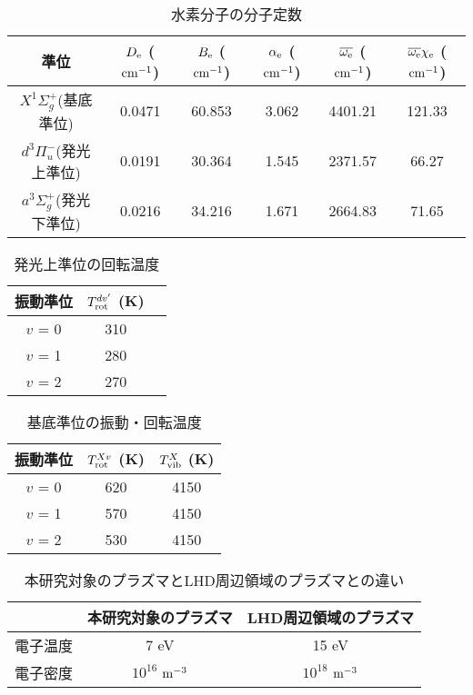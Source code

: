 \listoftables
{}

\begin{table}
    \caption{水素分子の分子定数\cite{nist}}
    \label{table:molecular-constants}
    \centering
    \begin{tabular}{cccccc}
        \hline
        準位 & $D_{\rm e}$ ($\rm cm^{-1}$)& $B_{\rm e}$ ($\rm cm^{-1}$)& $\alpha_{\rm e}$ ($\rm cm^{-1}$)& $\overline{\omega_{\rm e}}$ ($\rm cm^{-1}$)& $\overline{\omega_{\rm e}} \chi_{\rm e}$ ($\rm cm^{-1}$)\\
        \hline
        $X^1 \Sigma^+_g$(基底準位) & 0.0471 & 60.853 & 3.062 & 4401.21 & 121.33\\
        $d^3 \Pi^-_u$(発光上準位) & 0.0191 & 30.364 & 1.545 & 2371.57 & 66.27\\
        $a^3 \Sigma^+_g$(発光下準位) & 0.0216 & 34.216 & 1.671 & 2664.83 & 71.65\\
        \hline
    \end{tabular}
\end{table}

\begin{table}
    \caption{発光上準位の回転温度}
    \label{table:upper-temperatures}
    \centering
    \begin{tabular}{ccc}
        \hline
        振動準位 & $T^{dv'}_{\rm rot}$ (K)\\
        \hline
        $v$ = 0 & 310\\
        $v$ = 1 & 280\\
        $v$ = 2 & 270\\
        \hline
    \end{tabular}
\end{table}

\begin{table}
    \caption{基底準位の振動・回転温度}
    \label{table:fitting-result}
    \centering
    \begin{tabular}{ccc}
        \hline
        振動準位 & $T^{Xv}_{\rm rot}$ (K) & $T^{X}_{\rm vib}$ (K)\\
        \hline
        $v$ = 0 & 620 & 4150\\
        $v$ = 1 & 570 & 4150\\
        $v$ = 2 & 530 & 4150\\
        \hline
    \end{tabular}
\end{table}

\begin{table}
    \caption{本研究対象のプラズマとLHD周辺領域のプラズマとの違い}
    \label{table:LHD-and-this-plasma}
    \centering
    \begin{tabular}{ccc}
        \hline
         & 本研究対象のプラズマ & LHD周辺領域のプラズマ\\
        \hline
        電子温度 & 7 eV & 15 eV\\
        電子密度 & $10^{16}$ $\rm m^{-3}$ & $10^{18}$ $\rm m^{-3}$\\
        \hline
    \end{tabular}
\end{table}

